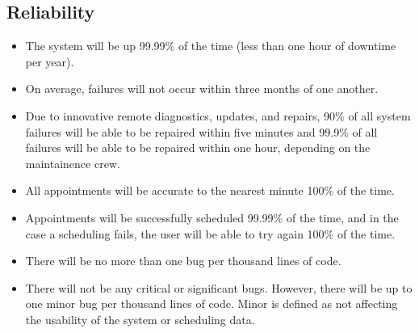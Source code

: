 \subsection{Reliability}
\begin{itemize}
\item The system will be up 99.99\% of the time (less than one hour of downtime per year).
\item On average, failures will not occur within three months of one another.
\item Due to innovative remote diagnostics, updates, and repairs, 90\% of all system failures will be able to be repaired within five minutes and 99.9\% of all failures will be able to be repaired within one hour, depending on the maintainence crew.
\item All appointments will be accurate to the nearest minute 100\% of the time.
\item Appointments will be successfully scheduled 99.99\% of the time, and in the case a scheduling fails, the user will be able to try again 100\% of the time.
\item There will be no more than one bug per thousand lines of code.
\item There will not be any critical or significant bugs. However, there will be up to one minor bug per thousand lines of code. Minor is defined as not affecting the usability of the system or scheduling data.
\end{itemize}

